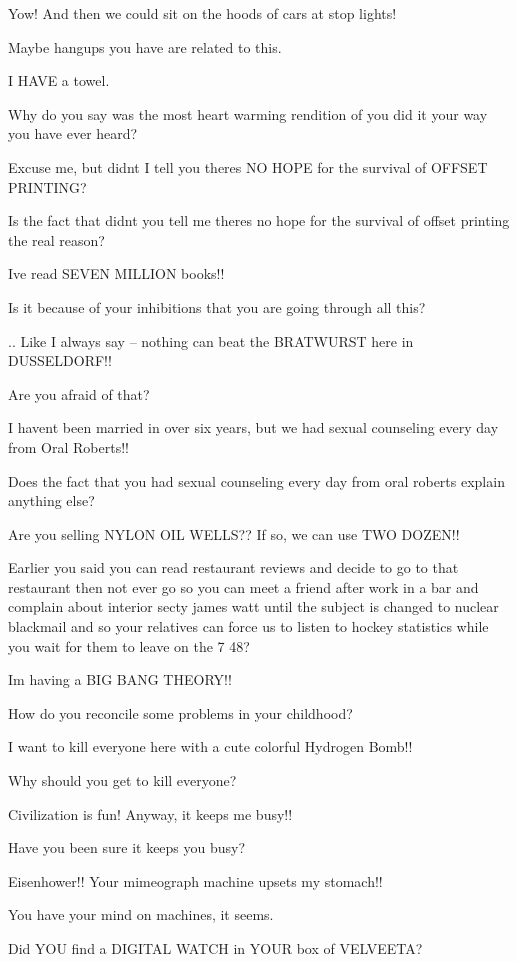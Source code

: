 \documentclass[cropmarks, frame, english]{idamasterthesis}
\begin{document}
Yow!  And then we could sit on the hoods of cars at stop lights!

Maybe hangups you have are related to this.

I HAVE a towel.

Why do you say was the most heart warming rendition of you did it your
way you have ever heard?

Excuse me, but didnt I tell you theres NO HOPE for the
 survival of OFFSET PRINTING?

Is the fact that didnt you tell me theres no hope for the survival
of offset printing the real reason?

Ive read SEVEN MILLION books!!

Is it because of your inhibitions that you are going through all this?

..  Like I always say -- nothing can beat the BRATWURST
 here in DUSSELDORF!!

Are you afraid of that?

I havent been married in over six years, but we had sexual counseling
 every day from Oral Roberts!!

Does the fact that you had sexual counseling every day from oral
roberts explain anything else?

Are you selling NYLON OIL WELLS??  If so, we can use TWO DOZEN!!

Earlier you said you can read restaurant reviews and decide to go to
that restaurant then not ever go so you can meet a friend after work
in a bar and complain about interior secty james watt until the
subject is changed to nuclear blackmail and so your relatives can
force us to listen to hockey statistics while you wait for them to
leave on the 7 48?

Im having a BIG BANG THEORY!!

How do you reconcile some problems in your childhood?

I want to kill everyone here with a cute colorful Hydrogen Bomb!!

Why should you get to kill everyone?

Civilization is fun!  Anyway, it keeps me busy!!

Have you been sure it keeps you busy?

Eisenhower!!  Your mimeograph machine upsets my stomach!!

You have your mind on machines, it seems.

Did YOU find a DIGITAL WATCH in YOUR box of VELVEETA?
\end{document}
